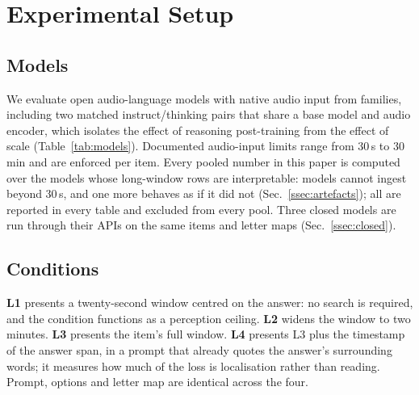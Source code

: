 \documentclass{article}
\begin{document}
\section{Experimental Setup}
\label{sec:setup}

\subsection{Models}
We evaluate \Nmodels{} open audio-language models with native audio input
from \Nfamilies{} families, including two matched instruct/thinking pairs
that share a base model and audio encoder, which isolates the effect of
reasoning post-training from the effect of scale (Table~\ref{tab:models}).
Documented audio-input limits range from 30\,s to 30\,min and are enforced
per item. Every pooled number in this paper is computed over the
\Nfullcov{} models whose long-window rows are interpretable: \Ntrunc{}
models cannot ingest beyond 30\,s, and one more behaves as if it did not
(Sec.~\ref{ssec:artefacts}); all \Nexcluded{} are reported in every table
and excluded from every pool. Three closed models are run through their
APIs on the same items and letter maps (Sec.~\ref{ssec:closed}).

\subsection{Conditions}
\textbf{L1} presents a twenty-second window centred on the answer: no search
is required, and the condition functions as a perception ceiling.
\textbf{L2} widens the window to two minutes. \textbf{L3} presents the item's
full window. \textbf{L4} presents L3 plus the timestamp of the answer span,
in a prompt that already quotes the answer's surrounding words; it measures
how much of the loss is localisation rather than reading. Prompt, options
and letter map are identical across the four.
\end{document}
